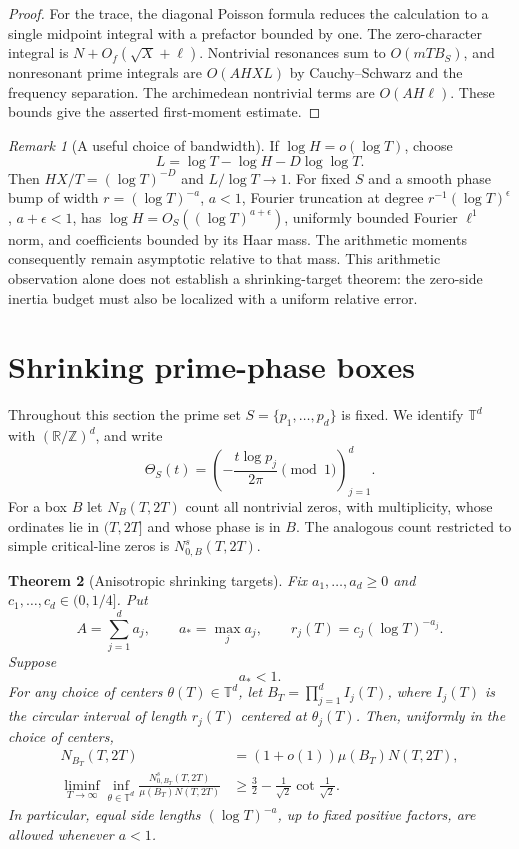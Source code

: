 \documentclass[11pt,letterpaper]{article}
\newtheorem{theorem}{Theorem}[section]
\theoremstyle{definition}
\theoremstyle{remark}
\newtheorem{remark}[theorem]{Remark}
\newcommand{\1}{\mathbf 1}
\begin{document}
\begin{proof}
For the trace, the diagonal Poisson formula reduces the calculation
to a single midpoint integral with a prefactor bounded by one.
The zero-character integral is $N+O_f(\sqrt X+\ell)$.
Nontrivial resonances sum to $O(mTB_S)$, and nonresonant prime
integrals are $O(AHXL)$ by Cauchy--Schwarz and the frequency
separation. The archimedean nontrivial terms are $O(AH\ell)$.
These bounds give the asserted first-moment estimate.
\end{proof}

\begin{remark}[A useful choice of bandwidth]
If $\log H=o(\log T)$, choose
\[
 L=\log T-\log H-D\log\log T.
\]
Then $HX/T=(\log T)^{-D}$ and $L/\log T\to1$.
For fixed $S$ and a smooth phase bump of width
$r=(\log T)^{-a}$, $a<1$, Fourier truncation at degree
$r^{-1}(\log T)^\epsilon$, $a+\epsilon<1$, has
$\log H=O_S((\log T)^{a+\epsilon})$, uniformly bounded Fourier
$\ell^1$ norm, and coefficients bounded by its Haar mass.
The arithmetic moments consequently remain asymptotic relative to
that mass. This arithmetic observation alone does not establish
a shrinking-target theorem: the zero-side inertia budget must also
be localized with a uniform relative error.
\end{remark}




\section{Shrinking prime-phase boxes}
\label{p04:sec:shrinking-boxes}

Throughout this section the prime set $S=\{p_1,\ldots,p_d\}$ is
fixed.  We identify $\mathbb T^d$ with $(\mathbb R/\mathbb Z)^d$,
and write
\[
 \Theta_S(t)=\left(-\frac{t\log p_j}{2\pi}\pmod1\right)_{j=1}^d.
\]
For a box $B$ let $N_B(T,2T)$ count all nontrivial zeros, with
multiplicity, whose ordinates lie in $(T,2T]$ and whose phase is in
$B$.  The analogous count restricted to simple critical-line zeros
is $N^s_{0,B}(T,2T)$.

\begin{theorem}[Anisotropic shrinking targets]
\label{p04:thm:shrinking-boxes}
Fix $a_1,\ldots,a_d\ge0$ and $c_1,\ldots,c_d\in(0,1/4]$. Put
\[
 A=\sum_{j=1}^d a_j,\qquad a_* =\max_j a_j,
 \qquad r_j(T)=c_j(\log T)^{-a_j}.
\]
Suppose
\begin{equation}\label{p04:eq:shrinking-range}
 a_*<1.
\end{equation}
For any choice of centers $\theta(T)\in\mathbb T^d$, let
$B_T=\prod_{j=1}^d I_j(T)$, where $I_j(T)$ is the circular interval
of length $r_j(T)$ centered at $\theta_j(T)$. Then, uniformly in the
choice of centers,
\begin{align}
 N_{B_T}(T,2T)&=(1+o(1))\mu(B_T)N(T,2T),
                 \label{p04:eq:shrinking-all}\\
 \liminf_{T\to\infty}
 \inf_{\theta\in\mathbb T^d}
 \frac{N^s_{0,B_T}(T,2T)}{\mu(B_T)N(T,2T)}
 &\ge \frac32-\frac1{\sqrt2}\cot\frac1{\sqrt2}.
                 \label{p04:eq:shrinking-simple}
\end{align}
In particular, equal side lengths $(\log T)^{-a}$, up to fixed
positive factors, are allowed whenever $a<1$.
\end{theorem}
\end{document}
